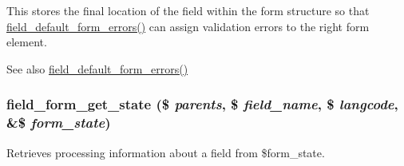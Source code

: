 This stores the final location of the field within the form structure so that \hyperlink{field_8form_8inc_a0649a57b5581c7896bcd997aa0e3e172}{field\_\-default\_\-form\_\-errors()} can assign validation errors to the right form element.

\begin{DoxySeeAlso}{See also}
\hyperlink{field_8form_8inc_a0649a57b5581c7896bcd997aa0e3e172}{field\_\-default\_\-form\_\-errors()} 
\end{DoxySeeAlso}
\hypertarget{field_8form_8inc_a84146d3d086bfc6b242f01c23e552435}{
\subsubsection[{field\_\-form\_\-get\_\-state}]{\setlength{\rightskip}{0pt plus 5cm}field\_\-form\_\-get\_\-state (\$ {\em parents}, \/  \$ {\em field\_\-name}, \/  \$ {\em langcode}, \/  \&\$ {\em form\_\-state})}}
\label{field_8form_8inc_a84146d3d086bfc6b242f01c23e552435}
Retrieves processing information about a field from \$form\_\-state.



